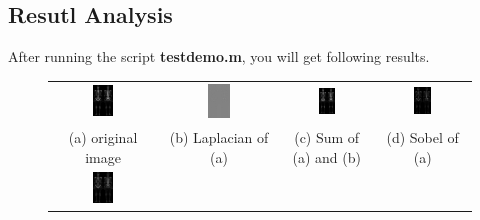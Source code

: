 \documentclass[11pt,a4paper]{article}
\begin{document}
\subsection{Resutl Analysis}
After running the script \textbf{testdemo.m}, you will get following results.

\begin{figure}[!htbp]
	\centering
	\begin{tabular}{cccc} 
		\includegraphics[width=0.2\textwidth]{pro2/a}&
		\includegraphics[width=0.2\textwidth]{pro2/b}&
		\includegraphics[width=0.2\textwidth]{pro2/c}&
		\includegraphics[width=0.2\textwidth]{pro2/d} \\
		(a) original image & (b) Laplacian of (a) & (c) Sum of (a) and (b)
		& (d) Sobel of (a)\\
		\includegraphics[width=0.2\textwidth]{pro2/e}&

\end{tabular}
\end{figure}
\end{document}
